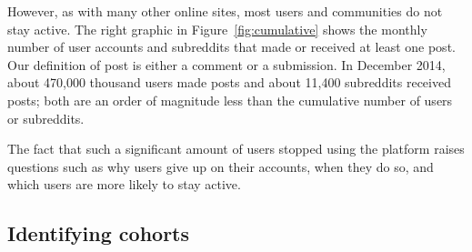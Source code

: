 However, as with many other online sites, most users \cite{} and communities \cite{butler/kraut paper} do not stay active. The right graphic in Figure~\ref{fig:cumulative} shows the monthly number of user accounts and subreddits that made or received at least one post. Our definition of post is either a comment or a submission. In December 2014, about 470,000 thousand users made posts and about 11,400 subreddits received posts; both are an order of magnitude less than the cumulative number of users or subreddits.  



The fact that such a significant amount of users stopped using the platform raises questions such as why users give up on their accounts, when they do so, and which users are more likely to stay active. 

\subsection{Identifying cohorts}
